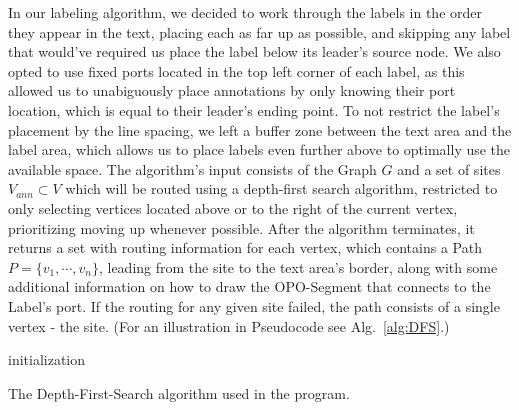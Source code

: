 \documentclass[11pt,a4paper]{vutinfth}
\begin{document}
In our labeling algorithm, we decided to work through the labels in the order they appear in the text, placing each as far up as possible, and skipping any label that would've required us place the label below its leader's source node. We also opted to use fixed ports located in the top left corner of each label, as this allowed us to unabiguously place annotations by only knowing their port location, which is equal to their leader's ending point. To not restrict the label's placement by the line spacing, we left a buffer zone between the text area and the label area, which allows us to place labels even further above to optimally use the available space.
The algorithm's input consists of the Graph $G$ and a set of sites $V_{ann} \subset V$ which will be routed using a depth-first search algorithm, restricted to only selecting vertices located above or to the right of the current vertex, prioritizing moving up whenever possible.  After the algorithm terminates, it returns a set with routing information for each vertex, which contains a Path $P=\{v_1, \cdots, v_n\}$, leading from the site to the text area's border, along with some additional information on how to draw the OPO-Segment that connects to the Label's port. If the routing for any given site failed, the path consists of a single vertex - the site. (For an illustration in Pseudocode see Alg.~\ref{alg:DFS}.)

\begin{algorithm}

\DontPrintSemicolon
{}



initialization\;
\caption{The Depth-First-Search algorithm used in the program.}
\label{alg:DFS}
\end{algorithm}
\end{document}
